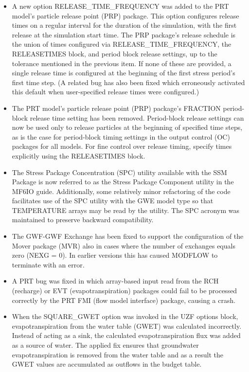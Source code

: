 \begin{itemize}
    \item A new option RELEASE\_TIME\_FREQUENCY was added to the PRT model's particle release point (PRP) package. This option configures release times on a regular interval for the duration of the simulation, with the first release at the simulation start time. The PRP package's release schedule is the union of times configured via RELEASE\_TIME\_FREQUENCY, the RELEASETIMES block, and period block release settings, up to the tolerance mentioned in the previous item. If none of these are provided, a single release time is configured at the beginning of the first stress period's first time step. (A related bug has also been fixed which erroneously activated this default when user-specified release times were configured.)
    \item The PRT model's particle release point (PRP) package's FRACTION period-block release time setting has been removed. Period-block release settings can now be used only to release particles at the beginning of specified time steps, as is the case for period-block timing settings in the output control (OC) packages for all models. For fine control over release timing, specify times explicitly using the RELEASETIMES block.
    \item The Stress Package Concentration (SPC) utility available with the SSM Package is now referred to as the Stress Package Component utility in the MF6IO guide.  Additionally, some relatively minor refactoring of the code facilitates use of the SPC utility with the GWE model type so that TEMPERATURE arrays may be read by the utility.  The SPC acronym was maintained to preserve backward compatibility.
    \item The GWF-GWF Exchange has been fixed to support the configuration of the Mover package (MVR) also in cases where the number of exchanges equals zero (NEXG = 0). In earlier versions this has caused MODFLOW to terminate with an error.
    \item A PRT bug was fixed in which array-based input read from the RCH (recharge) or EVT (evapotranspiration) packages could fail to be processed correctly by the PRT FMI (flow model interface) package, causing a crash.
    \item When the SQUARE\_GWET option was invoked in the UZF options block, evapotranspiration from the water table (GWET) was calculated incorrectly.  Instead of acting as a sink, the calculated evapotranspiration flux was added as a source of water.  The applied fix ensures that groundwater evapotranspiration is removed from the water table and as a result the GWET values are accumulated as outflows in the budget table.

\end{itemize}
